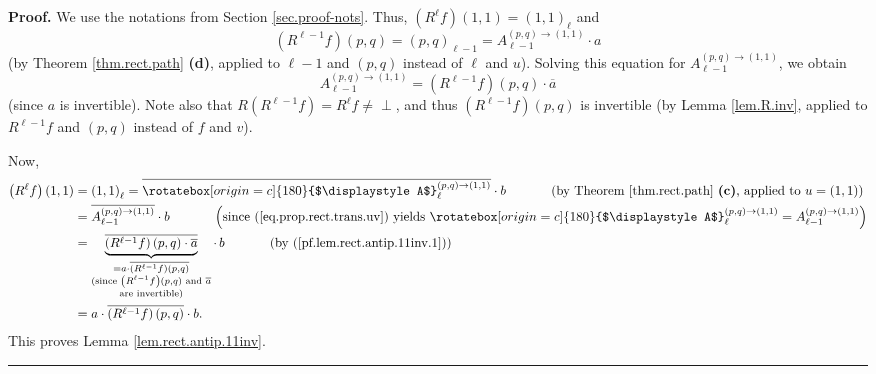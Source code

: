 \documentclass[numbers=enddot,12pt,final,onecolumn,notitlepage]{scrartcl}%
\theoremstyle{definition}
\newcommand{\undf}{\operatorname*{\bot}}
\newcommand{\upslack}{\mathchoice{\rotatebox[origin=c]{180}{$\displaystyle A$}}{\rotatebox[origin=c]{180}{$\textstyle A$}}{\rotatebox[origin=c]{180}{$\scriptstyle A$}}{\rotatebox[origin=c]{180}{$\scriptscriptstyle A$}}}
\newcommand{\downslack}{A}
\newenvironment{proof}[1][Proof]{\noindent\textbf{#1.} }{\ \rule{0.5em}{0.5em}}
\begin{document}
\begin{proof}
We use the notations from Section \ref{sec.proof-nots}. Thus, $\left(
R^{\ell}f\right)  \left(  1,1\right)  =\left(  1,1\right)  _{\ell}$ and%
\[
\left(  R^{\ell-1}f\right)  \left(  p,q\right)  =\left(  p,q\right)  _{\ell
-1}=\downslack_{\ell-1}^{\left(  p,q\right)  \rightarrow\left(  1,1\right)
}\cdot a
\]
(by Theorem \ref{thm.rect.path} \textbf{(d)}, applied to $\ell-1$ and $\left(
p,q\right)  $ instead of $\ell$ and $u$). Solving this equation for
$\downslack_{\ell-1}^{\left(  p,q\right)  \rightarrow\left(  1,1\right)  }$,
we obtain%
\begin{equation}
\downslack_{\ell-1}^{\left(  p,q\right)  \rightarrow\left(  1,1\right)
}=\left(  R^{\ell-1}f\right)  \left(  p,q\right)  \cdot\overline{a}
\label{pf.lem.rect.antip.11inv.1}%
\end{equation}
(since $a$ is invertible). Note also that $R\left(  R^{\ell-1}f\right)
=R^{\ell}f\neq\undf$, and thus $\left(  R^{\ell-1}f\right)  \left(
p,q\right)  $ is invertible (by Lemma \ref{lem.R.inv}, applied to $R^{\ell
-1}f$ and $\left(  p,q\right)  $ instead of $f$ and $v$).

Now,%
\begin{align*}
\left(  R^{\ell}f\right)  \left(  1,1\right)   &  =\left(  1,1\right)  _{\ell
}=\overline{\upslack_{\ell}^{\left(  p,q\right)  \rightarrow\left(
1,1\right)  }}\cdot b\ \ \ \ \ \ \ \ \ \ \left(  \text{by Theorem
\ref{thm.rect.path} \textbf{(c)}, applied to }u=\left(  1,1\right)  \right) \\
&  =\overline{\downslack_{\ell-1}^{\left(  p,q\right)  \rightarrow\left(
1,1\right)  }}\cdot b\ \ \ \ \ \ \ \ \ \ \left(  \text{since
(\ref{eq.prop.rect.trans.uv}) yields }\upslack_{\ell}^{\left(  p,q\right)
\rightarrow\left(  1,1\right)  }=\downslack_{\ell-1}^{\left(  p,q\right)
\rightarrow\left(  1,1\right)  }\right) \\
&  =\underbrace{\overline{\left(  R^{\ell-1}f\right)  \left(  p,q\right)
\cdot\overline{a}}}_{\substack{=a\cdot\overline{\left(  R^{\ell-1}f\right)
\left(  p,q\right)  }\\\text{(since }\left(  R^{\ell-1}f\right)  \left(
p,q\right)  \text{ and }\overline{a}\\\text{are invertible)}}}\cdot
\,b\ \ \ \ \ \ \ \ \ \ \left(  \text{by (\ref{pf.lem.rect.antip.11inv.1}%
)}\right) \\
&  =a\cdot\overline{\left(  R^{\ell-1}f\right)  \left(  p,q\right)  }\cdot b.
\end{align*}
This proves Lemma \ref{lem.rect.antip.11inv}.
\end{proof}
\end{document}
